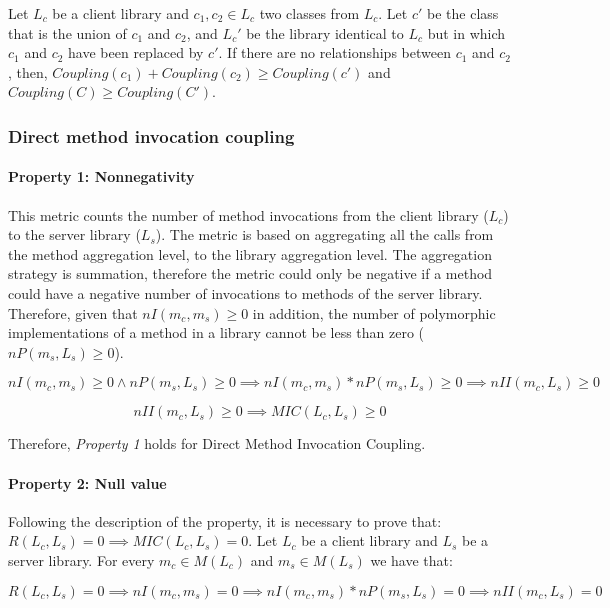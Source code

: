 Let $L_c$ be a client library and $c_1, c_2 \in L_c$ two classes from $L_c$. Let $c'$ be the class that is the union of  $c_1$ and $c_2$, and $L_c'$ be the library identical to $L_c$ but in which $c_1$ and $c_2$ have been replaced by $c'$. If there are no relationships between $c_1$ and $c_2$, then, $Coupling(c_1) + Coupling(c_2) \ge Coupling(c')$ and $Coupling(C) \ge Coupling(C')$.

\subsubsection{Direct method invocation coupling}

\paragraph{Property 1: Nonnegativity}
This metric counts the number of method invocations from the client library ($L_c$) to the server library ($L_s$). The metric is based on aggregating all the calls from the method aggregation level, to the library aggregation level. The aggregation strategy is summation, therefore the metric could only be negative if a method could have a negative number of invocations to methods of the server library. Therefore, given that $nI(m_c, m_s) \ge 0$ in addition, the number of polymorphic implementations of a method in a library cannot be less than zero ($nP(m_s, L_s) \ge 0$).

\begin{equation*}
   nI(m_c, m_s) \ge 0 \land nP(m_s, L_s) \ge 0 \implies nI(m_c, m_s) * nP(m_s, L_s) \ge 0 \implies nII(m_c, L_s) \ge 0
\end{equation*}

\begin{equation*}
   nII(m_c, L_s) \ge 0 \implies MIC(L_c, L_s) \ge 0
\end{equation*}

\blankls
Therefore, \textit{Property 1} holds for Direct Method Invocation Coupling.

\paragraph{Property 2: Null value}
Following the description of the property, it is necessary to prove that: $R(L_c, L_s) = 0 \implies MIC(L_c, L_s) = 0$. Let $L_c$ be a client library and $L_s$ be a server library. For every $m_c \in M(L_c)$ and $m_s \in M(L_s)$ we have that:

\begin{equation*}
   R(L_c, L_s) = 0 \implies nI(m_c, m_s) = 0 \implies nI(m_c, m_s) * nP(m_s, L_s) = 0 \implies nII(m_c, L_s) = 0
\end{equation*}

